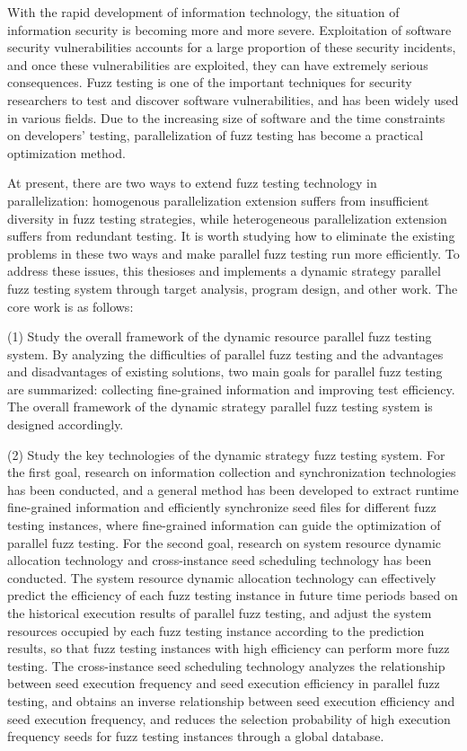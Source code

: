 \documentclass[master]{thesis-uestc}
\begin{document}
\begin{englishabstract}

With the rapid development of information technology, the situation of information security is becoming more and more severe. Exploitation of software security vulnerabilities accounts for a large proportion of these security incidents, and once these vulnerabilities are exploited, they can have extremely serious consequences. Fuzz testing is one of the important techniques for security researchers to test and discover software vulnerabilities, and has been widely used in various fields. Due to the increasing size of software and the time constraints on developers' testing, parallelization of fuzz testing has become a practical optimization method.

At present, there are two ways to extend fuzz testing technology in parallelization: homogenous parallelization extension suffers from insufficient diversity in fuzz testing strategies, while heterogeneous parallelization extension suffers from redundant testing. It is worth studying how to eliminate the existing problems in these two ways and make parallel fuzz testing run more efficiently. To address these issues, this thesioses and implements a dynamic strategy parallel fuzz testing system through target analysis, program design, and other work. The core work is as follows:

(1) Study the overall framework of the dynamic resource parallel fuzz testing system. By analyzing the difficulties of parallel fuzz testing and the advantages and disadvantages of existing solutions, two main goals for parallel fuzz testing are summarized: collecting fine-grained information and improving test efficiency. The overall framework of the dynamic strategy parallel fuzz testing system is designed accordingly.

(2) Study the key technologies of the dynamic strategy fuzz testing system. For the first goal, research on information collection and synchronization technologies has been conducted, and a general method has been developed to extract runtime fine-grained information and efficiently synchronize seed files for different fuzz testing instances, where fine-grained information can guide the optimization of parallel fuzz testing. For the second goal, research on system resource dynamic allocation technology and cross-instance seed scheduling technology has been conducted. The system resource dynamic allocation technology can effectively predict the efficiency of each fuzz testing instance in future time periods based on the historical execution results of parallel fuzz testing, and adjust the system resources occupied by each fuzz testing instance according to the prediction results, so that fuzz testing instances with high efficiency can perform more fuzz testing. The cross-instance seed scheduling technology analyzes the relationship between seed execution frequency and seed execution efficiency in parallel fuzz testing, and obtains an inverse relationship between seed execution efficiency and seed execution frequency, and reduces the selection probability of high execution frequency seeds for fuzz testing instances through a global database.


\end{englishabstract}
\end{document}
